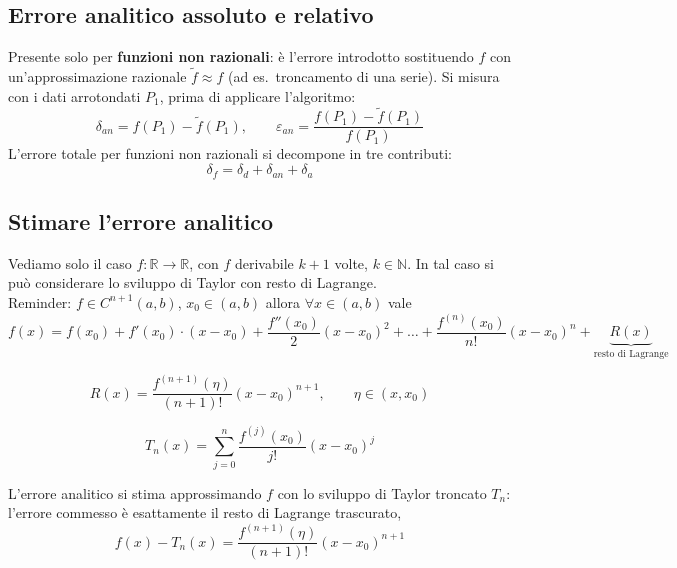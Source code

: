 \documentclass[12pt,a4paper,]{report}
\begin{document}
\subsection{Errore analitico assoluto e relativo}
\begin{definizione}
    Presente solo per \textbf{funzioni non razionali}: è l'errore introdotto sostituendo $f$ con un'approssimazione razionale $\tilde{f} \approx f$ (ad es.\ troncamento di una serie). Si misura con i dati arrotondati $P_1$, prima di applicare l'algoritmo:
    \[
    \delta_{an} = f(P_1) - \tilde{f}(P_1), \qquad
    \varepsilon_{an} = \frac{f(P_1) - \tilde{f}(P_1)}{f(P_1)}
    \]
    L'errore totale per funzioni non razionali si decompone in tre contributi:
    \[
    \delta_f = \delta_d + \delta_{an} + \delta_a
    \]
\end{definizione}

\subsection{Stimare l'errore analitico}
Vediamo solo il caso $f: \mathbb{R} \to \mathbb{R}$, con $f$ derivabile $k+1$ volte, $k \in \mathbb{N}$. In tal caso si può considerare lo sviluppo di Taylor con resto di Lagrange.\\
Reminder: $f\in C^{n+1}(a,b)$, $x_0\in(a,b)$ allora $\forall x\in(a,b)$ vale
\[
f(x) = f(x_0) + f'(x_0)\cdot(x-x_0) + \frac{f''(x_0)}{2}(x-x_0)^2 + \dots + \frac{f^{(n)}(x_0)}{n!}(x-x_0)^n
+ \underbrace{R(x)}_{\text{resto di Lagrange}}
\]

\[
R(x) = \frac{f^{(n+1)}(\eta)}{(n+1)!}(x-x_0)^{n+1}, \qquad \eta\in(x,x_0)
\]

\[
T_n(x) = \sum_{j=0}^n \frac{f^{(j)}(x_0)}{j!}(x-x_0)^j
\]

\begin{definizione}
    L'errore analitico si stima approssimando $f$ con lo sviluppo di Taylor troncato $T_n$: l'errore commesso è esattamente il resto di Lagrange trascurato,
    \[
    \boxed{f(x) - T_n(x) = \frac{f^{(n+1)}(\eta)}{(n+1)!}(x-x_0)^{n+1}}
    \]
\end{definizione}
\end{document}
